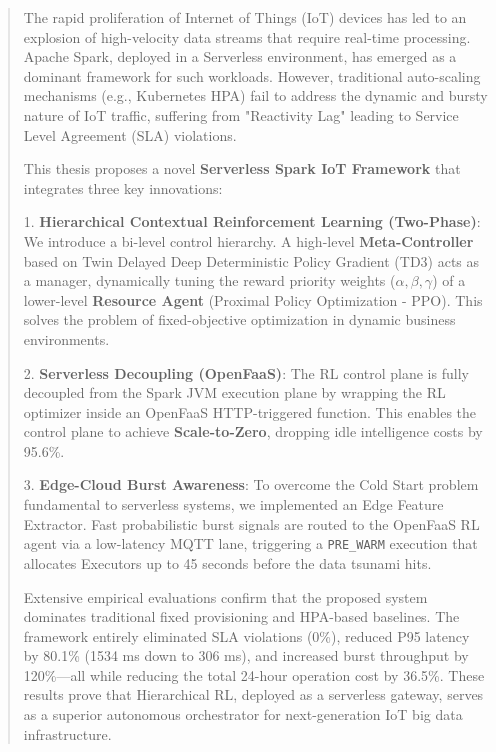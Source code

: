 \documentclass[12pt, a4paper]{report}
\begin{document}
\begin{abstract}
The rapid proliferation of Internet of Things (IoT) devices has led to an explosion of high-velocity data streams that require real-time processing. Apache Spark, deployed in a Serverless environment, has emerged as a dominant framework for such workloads. However, traditional auto-scaling mechanisms (e.g., Kubernetes HPA) fail to address the dynamic and bursty nature of IoT traffic, suffering from "Reactivity Lag" leading to Service Level Agreement (SLA) violations.

This thesis proposes a novel \textbf{Serverless Spark IoT Framework} that integrates three key innovations:

1. \textbf{Hierarchical Contextual Reinforcement Learning (Two-Phase)}: We introduce a bi-level control hierarchy. A high-level \textbf{Meta-Controller} based on Twin Delayed Deep Deterministic Policy Gradient (TD3) acts as a manager, dynamically tuning the reward priority weights ($\alpha, \beta, \gamma$) of a lower-level \textbf{Resource Agent} (Proximal Policy Optimization - PPO). This solves the problem of fixed-objective optimization in dynamic business environments.

2. \textbf{Serverless Decoupling (OpenFaaS)}: The RL control plane is fully decoupled from the Spark JVM execution plane by wrapping the RL optimizer inside an OpenFaaS HTTP-triggered function. This enables the control plane to achieve \textbf{Scale-to-Zero}, dropping idle intelligence costs by 95.6\%.

3. \textbf{Edge-Cloud Burst Awareness}: To overcome the Cold Start problem fundamental to serverless systems, we implemented an Edge Feature Extractor. Fast probabilistic burst signals are routed to the OpenFaaS RL agent via a low-latency MQTT lane, triggering a \texttt{PRE\_WARM} execution that allocates Executors up to 45 seconds before the data tsunami hits.

Extensive empirical evaluations confirm that the proposed system dominates traditional fixed provisioning and HPA-based baselines. The framework entirely eliminated SLA violations (0\%), reduced P95 latency by 80.1\% (1534 ms down to 306 ms), and increased burst throughput by 120\%—all while reducing the total 24-hour operation cost by 36.5\%. These results prove that Hierarchical RL, deployed as a serverless gateway, serves as a superior autonomous orchestrator for next-generation IoT big data infrastructure.
\end{abstract}
\clearpage
\end{document}
